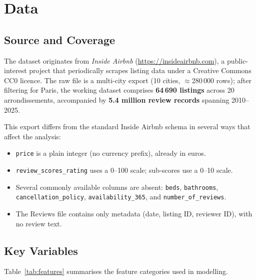 \documentclass[12pt, a4paper]{article}
\begin{document}
\section{Data}
\label{sec:data}

\subsection{Source and Coverage}

The dataset originates from \textit{Inside Airbnb} (\url{https://insideairbnb.com}), a public-interest project that periodically scrapes listing data under a Creative Commons CC0 licence. The raw file is a multi-city export (10 cities, \(\approx\)280\,000 rows); after filtering for Paris, the working dataset comprises \textbf{64\,690 listings} across 20 arrondissements, accompanied by \textbf{5.4 million review records} spanning 2010--2025.

This export differs from the standard Inside Airbnb schema in several ways that affect the analysis:
\begin{itemize}[itemsep=2pt]
  \item \texttt{price} is a plain integer (no currency prefix), already in euros.
  \item \texttt{review\_scores\_rating} uses a 0--100 scale; sub-scores use a 0--10 scale.
  \item Several commonly available columns are absent: \texttt{beds}, \texttt{bathrooms}, \texttt{cancellation\_policy}, \texttt{availability\_365}, and \texttt{number\_of\_reviews}.
  \item The Reviews file contains only metadata (date, listing ID, reviewer ID), with no review text.
\end{itemize}

\subsection{Key Variables}

Table~\ref{tab:features} summarises the feature categories used in modelling.
\end{document}

